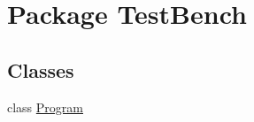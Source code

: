 \hypertarget{namespace_test_bench}{\section{Package Test\-Bench}
\label{namespace_test_bench}
}
\subsection*{Classes}
\begin{DoxyCompactItemize}
\item 
class \hyperlink{class_test_bench_1_1_program}{Program}
\end{DoxyCompactItemize}
